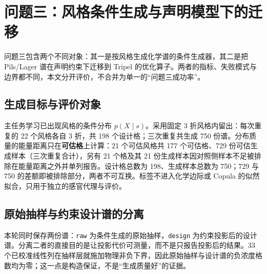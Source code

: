 \documentclass[11pt,a4paper]{article}
\begin{document}
\section{问题三：风格条件生成与声明模型下的迁移}\label{ux95eeux9898ux4e09ux98ceux683cux6761ux4ef6ux751fux6210ux4e0eux58f0ux660eux6a21ux578bux4e0bux7684ux8fc1ux79fb}

问题三包含两个不同对象：其一是按风格生成化学谱的条件生成器，其二是把
Pils/Lager 谱在声明约束下迁移到 Tripel
的优化算子。两者的指标、失败模式与边界都不同，本文分开评价，不合并为单一的``问题三成功率''。

\subsection{生成目标与评价对象}\label{ux751fux6210ux76eeux6807ux4e0eux8bc4ux4ef7ux5bf9ux8c61}

主任务学习已出现风格的条件分布 \(p(X\mid s)\)。采用固定 3
折风格内留出：每次重复的 22 个风格各自 3 折，共 198
个设计格；三次重复共生成 750
份谱。分布质量的能量距离只在\textbf{可估格}上计算：21 个可估风格共 177
个可估格、729 份可估生成样本（三次重复合计），另有 21 个格及其 21
份生成样本因对照侧样本不足被排除在能量距离之外并单列报告。设计格总数为
198、生成样本总数为 750；729 与 750
的差额即被排除部分，两者不可互换。标签不进入化学边际或 Copula
的似然拟合，只用于独立的感官代理与评价。

\subsection{原始抽样与约束设计谱的分离}\label{ux539fux59cbux62bdux6837ux4e0eux7ea6ux675fux8bbeux8ba1ux8c31ux7684ux5206ux79bb}

本轮同时保存两份谱：\texttt{raw} 为条件生成的原始抽样，\texttt{design}
为约束投影后的设计谱。分离二者的直接目的是让投影代价可测量，而不是只报告投影后的结果。33
个已校准线性列在抽样层就施加物理非负下界，因此原始抽样与设计谱的负浓度格数均为零；这一点是构造保证，不是``生成质量好''的证据。
\end{document}
